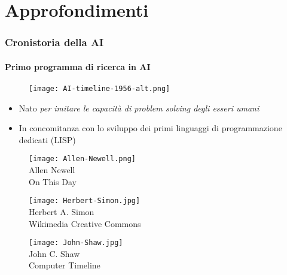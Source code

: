 \section{Approfondimenti}
%
\begin{frame}[t] \frametitle{Cronistoria della AI}
{\scriptsize
{}
\framesubtitle{Primo programma di ricerca in AI}
\vspace*{-.5cm}
	\begin{minipage}[t]{\textwidth}
		\begin{figure}[ht]
			\centering
			\texttt{[image: AI-timeline-1956-alt.png]}
		\end{figure}
	\end{minipage}
	\begin{itemize}[leftmargin=10pt,align=right]
		\onslide<2->\item[\alert{\faHandORight}] Nato \textit{per imitare le capacità di problem solving degli esseri umani}
		\onslide<3->\item[\alert{\faHandORight}] In concomitanza con lo sviluppo dei primi linguaggi di programmazione dedicati (LISP)
	\end{itemize}
	\begin{minipage}[b]{\textwidth}
		\begin{minipage}[b]{0.32\textwidth}
			\centering
			\begin{figure}[ht]
				\texttt{[image: Allen-Newell.png]}
				\\Allen Newell\\\textsuperscript{\textcopyright}On This Day
			\end{figure}
		\end{minipage}
		\begin{minipage}[b]{0.32\textwidth}
			\centering
			\begin{figure}[ht]
				\texttt{[image: Herbert-Simon.jpg]}
				\\Herbert A. Simon\\\textsuperscript{\textcopyright}Wikimedia Creative Commons
			\end{figure}
		\end{minipage}
		\begin{minipage}[b]{0.32\textwidth}
			\centering
			\begin{figure}[ht]
				\texttt{[image: John-Shaw.jpg]}
				\\John C. Shaw\\\textsuperscript{\textcopyright}Computer Timeline
			\end{figure}
		\end{minipage}
	\end{minipage}
}
\end{frame}
